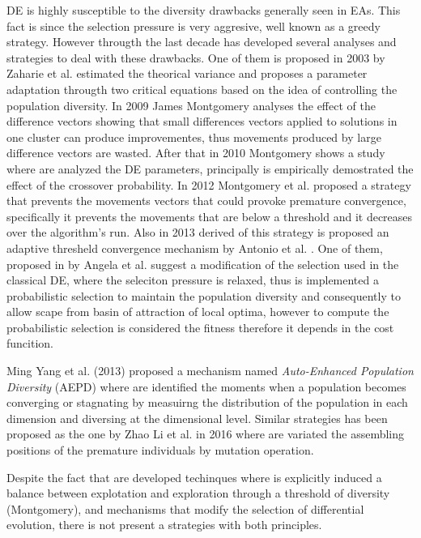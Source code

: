 DE is highly susceptible to the diversity drawbacks generally seen in EAs.
%
This fact is since the selection pressure is very aggresive, well known as a greedy strategy.
%
However througth the last decade has developed several analyses and strategies to deal with these drawbacks.
%
One of them is proposed in 2003 by Zaharie et al.  \cite{zaharie2003control} estimated the theorical variance and proposes a parameter adaptation througth two critical equations based on the idea of controlling the population diversity.
%
In 2009 James Montgomery \cite{montgomery2009differential} analyses the effect of the difference vectors showing that small differences vectors applied to solutions in one cluster can produce improvementes, thus movements produced by large difference vectors are wasted.
%
After that in 2010 Montgomery shows a study where are analyzed the DE parameters, principally is empirically demostrated the effect of the crossover probability.
%
In 2012 Montgomery et al. \cite{montgomery2012simple} proposed a strategy that prevents the movements vectors that could provoke premature convergence, specifically it prevents the movements that are below a threshold and it decreases over the algorithm's run.
%
Also in 2013 derived of this strategy is proposed an adaptive thresheld convergence mechanism by Antonio et al. \cite{bolufe2013differential}.
%
One of them, proposed in \cite{sa2008exploration} by Angela et al. suggest a modification of the selection used in the classical DE, where the seleciton pressure is relaxed, thus is implemented a probabilistic selection to maintain the population diversity and consequently to allow scape from basin of attraction of local optima, however to compute the probabilistic selection is considered the fitness therefore it depends in the cost funcition.
%

Ming Yang et al. (2013) \cite{yang2015differential} proposed a mechanism named \textit{Auto-Enhanced Population Diversity} (AEPD) where are identified the moments when a population becomes converging or stagnating by measuirng the distribution of the population in each dimension and diversing at the dimensional level.
%
Similar strategies has been proposed as the one by Zhao Li et al. in 2016 \cite{zhao2016differential} where are variated the assembling positions of the premature individuals by mutation operation.

Despite the fact that are developed techinques where is explicitly induced a balance between explotation and exploration through a threshold of diversity (Montgomery), and mechanisms that modify the selection of differential evolution, there is not present a strategies with both principles.
